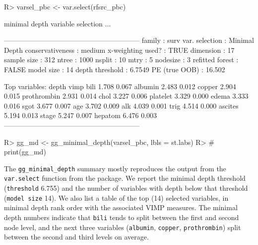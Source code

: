 \documentclass[article, nojss]{jss}
\begin{document}
\begin{Schunk}
\begin{Sinput}
R> varsel_pbc <- var.select(rfsrc_pbc)
\end{Sinput}
\begin{Soutput}
minimal depth variable selection ...


-----------------------------------------------------------
family             : surv
var. selection     : Minimal Depth
conservativeness   : medium
x-weighting used?  : TRUE
dimension          : 17
sample size        : 312
ntree              : 1000
nsplit             : 10
mtry               : 5
nodesize           : 3
refitted forest    : FALSE
model size         : 14
depth threshold    : 6.7549
PE (true OOB)      : 16.502


Top variables:
            depth  vimp
bili        1.708 0.067
albumin     2.483 0.012
copper      2.904 0.015
prothrombin 2.931 0.014
chol        3.227 0.006
platelet    3.329 0.000
edema       3.333 0.016
sgot        3.677 0.007
age         3.702 0.009
alk         4.039 0.001
trig        4.514 0.000
ascites     5.194 0.013
stage       5.247 0.007
hepatom     6.476 0.003
-----------------------------------------------------------
\end{Soutput}
\begin{Sinput}
R> gg_md <- gg_minimal_depth(varsel_pbc, lbls = st.labs)
R> # print(gg_md)
\end{Sinput}
\end{Schunk}

The \texttt{gg\_minimal\_depth} summary mostly reproduces the output
from the \texttt{var.select} function from the 
package. We report the minimal depth threshold (\texttt{threshold}
6.755) and the number of variables with depth below that threshold
(\texttt{model\ size} 14). We also list a table of the top (14) selected
variables, in minimal depth rank order with the associated VIMP
measures. The minimal depth numbers indicate that \texttt{bili} tends to
split between the first and second node level, and the next three
variables (\texttt{albumin}, \texttt{copper}, \texttt{prothrombin})
split between the second and third levels on average.
\end{document}
